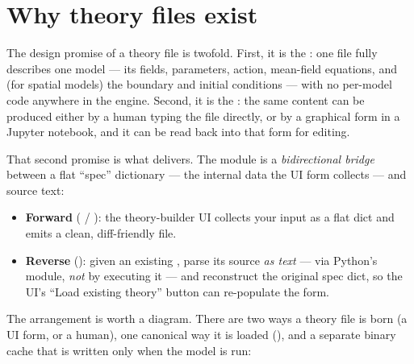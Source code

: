\section{Why theory files exist}

The design promise of a theory file is twofold. First, it is the : one file fully describes one model --- its fields, parameters,
\msrjd{} action, mean-field equations, and (for spatial models) the boundary and
initial conditions --- with no per-model code anywhere in the engine. Second, it
is the : the same content can be
produced either by a human typing the file directly, or by a graphical form in a
Jupyter notebook, and it can be read back into that form for editing.

That second promise is what  delivers. The
module is a \emph{bidirectional bridge} between a flat ``spec'' dictionary --- the
internal data the UI form collects --- and  source text:

\begin{itemize}
  \item \textbf{Forward} ( / ):
        the theory-builder UI collects your input as a flat dict and emits a
        clean, diff-friendly  file.
  \item \textbf{Reverse} (): given an existing
        , parse its source \emph{as text} --- via Python's
         module, \emph{not} by executing it --- and reconstruct the
        original spec dict, so the UI's ``Load existing theory'' button can
        re-populate the form.
\end{itemize}

The arrangement is worth a diagram. There are two ways a theory file is born (a
UI form, or a human), one canonical way it is loaded (), and a
separate binary cache that is written only when the model is run:

